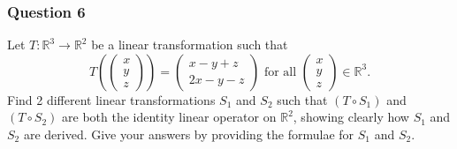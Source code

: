 \documentclass{article}
\begin{document}
\subsubsection*{Question 6}
Let $T:\mathbb{R}^3\rightarrow\mathbb{R}^2$ be a linear transformation such that
\[T\left(\begin{pmatrix}x\\y\\z\end{pmatrix}\right)=\begin{pmatrix}x-y+z\\2x-y-z\end{pmatrix}\text{ for all }\begin{pmatrix}x\\y\\z\end{pmatrix}\in\mathbb{R}^3.\] Find 2 different linear transformations $S_1$ and $S_2$ such that $(T\circ S_1)$ and $(T\circ S_2)$ are both the identity linear operator on $\mathbb{R}^2$, showing clearly how $S_1$ and $S_2$ are derived. Give your answers by providing the formulae for $S_1$ and $S_2$.
\newline
\end{document}

